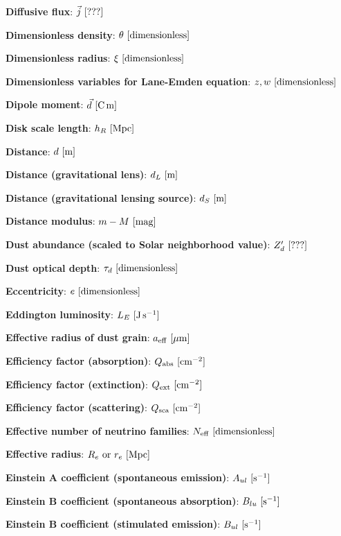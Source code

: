 \documentclass[a4paper,10pt]{article}
\begin{document}
{\noindent}\textbf{Diffusive flux}: $\vec{j} ~ [{\rm ???}]$

{\noindent}\textbf{Dimensionless density}: $\theta ~ [{\rm dimensionless}]$

{\noindent}\textbf{Dimensionless radius}: $\xi ~ [{\rm dimensionless}]$

{\noindent}\textbf{Dimensionless variables for Lane-Emden equation}: $z, w ~ [{\rm dimensionless}]$

{\noindent}\textbf{Dipole moment}: $\vec{d} ~ [{\rm C\,m}]$

{\noindent}\textbf{Disk scale length}: $h_R ~ [{\rm Mpc}]$

{\noindent}\textbf{Distance}: $d ~ [{\rm m}]$

{\noindent}\textbf{Distance (gravitational lens)}: $d_L ~ [{\rm m}]$

{\noindent}\textbf{Distance (gravitational lensing source)}: $d_S ~ [{\rm m}]$

{\noindent}\textbf{Distance modulus}: $m - M ~ [{\rm mag}]$

{\noindent}\textbf{Dust abundance (scaled to Solar neighborhood value)}: $Z_d' ~ [{\rm ???}]$

{\noindent}\textbf{Dust optical depth}: $\tau_d ~ [{\rm dimensionless}]$

{\noindent}\textbf{Eccentricity}: $e ~ [{\rm dimensionless}]$

{\noindent}\textbf{Eddington luminosity}: $L_E ~ [{\rm J\,s^{-1}}]$

{\noindent}\textbf{Effective radius of dust grain}: $a_{\rm eff} ~ [{\rm \mu m}]$

{\noindent}\textbf{Efficiency factor (absorption)}: $Q_{\rm abs} ~ [{\rm cm^{-2}}]$

{\noindent}\textbf{Efficiency factor (extinction)}: $Q_{\rm ext} ~ [{\rm cm^{-2}}]$

{\noindent}\textbf{Efficiency factor (scattering)}: $Q_{\rm sca} ~ [{\rm cm^{-2}}]$

{\noindent}\textbf{Effective number of neutrino families}: $N_\mathrm{eff} ~ [{\rm dimensionless}]$

{\noindent}\textbf{Effective radius}: $R_e~{\rm or}~r_e ~ [{\rm Mpc}]$

{\noindent}\textbf{Einstein A coefficient (spontaneous emission)}: $A_{ul} ~ [{\rm s^{-1}}]$

{\noindent}\textbf{Einstein B coefficient (spontaneous absorption)}: $B_{lu} ~ [{\rm s^{-1}}]$

{\noindent}\textbf{Einstein B coefficient (stimulated emission)}: $B_{ul} ~ [{\rm s^{-1}}]$
\end{document}
